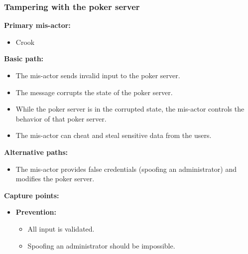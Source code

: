 \documentclass[a4paper,11pt]{report}
\begin{document}
\subsubsection{Tampering with the poker server}
\label{PokerServerCasesT}
\textbf{Primary mis-actor:}
\begin{itemize}
\item Crook
\end{itemize}
\textbf{Basic path:}
\begin{itemize}
\item The mis-actor sends invalid input to the poker server.
\item The message corrupts the state of the poker server.
\item While the poker server is in the corrupted state, the mis-actor controls the behavior of that poker server.
\item The mis-actor can cheat and steal sensitive data from the users.
\end{itemize}
\textbf{Alternative paths:}
\begin{itemize}
\item The mis-actor provides false credentials (spoofing an administrator) and modifies the poker server.
\end{itemize}
\textbf{Capture points:}
\begin{itemize}
\item \textbf{Prevention:}
\begin{itemize}
\item All input is validated.
\item Spoofing an administrator should be impossible.
\end{itemize}
\end{itemize}
\end{document}
